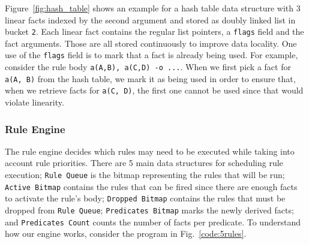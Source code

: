 Figure~\ref{fig:hash_table} shows an example for a hash table data structure
with 3 linear facts indexed by the second argument and stored as doubly linked list
in bucket \texttt{2}. Each linear fact contains the regular list pointers, a \texttt{flags} field
and the fact arguments. Those are all stored continuously to improve data
locality. One use of the \texttt{flags} field is to mark that a fact is already being used. For example,
consider the rule body \texttt{a(A,B), a(C,D) -o ...}. When we first pick a fact for \texttt{a(A, B)} from the hash table,
we mark it as being used in order to ensure that, when we retrieve facts for \texttt{a(C, D)}, the first one
cannot be used since that would violate linearity.

\subsubsection{Rule Engine}\label{rule_engine}

The rule engine decides which rules may need to be executed while taking into account rule priorities.
There are 5 main data structures for scheduling rule execution;
\texttt{Rule Queue} is the bitmap representing the rules that will be run;
\texttt{Active Bitmap} contains the rules that can be fired since there are enough facts to activate the rule's body;
\texttt{Dropped Bitmap} contains the rules that must be dropped from \texttt{Rule Queue};
\texttt{Predicates Bitmap} marks the newly derived facts;
and \texttt{Predicates Count} counts the number of facts per predicate.
To understand how our engine works, consider the program in Fig.~\ref{code:5rules}.

